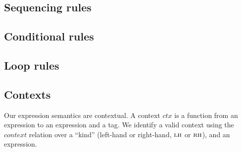 \documentclass{llncs}
\begin{document}
\subsection{Sequencing rules}

\sequencing

\subsection{Conditional rules}

\conditionals

\subsection{Loop rules}

\loops

\subsection{Contexts}
\label{app:contexts}

Our expression semantics are contextual. A context \(\mathit{ctx}\) is a function from an
expression to an expression and a tag. We identify a valid context using the \(\mathit{context}\)
relation over a ``kind'' (left-hand or right-hand, \(\textnormal{\sc lh}\) or \(\textnormal{\sc rh}\)),
and an expression.
\end{document}
